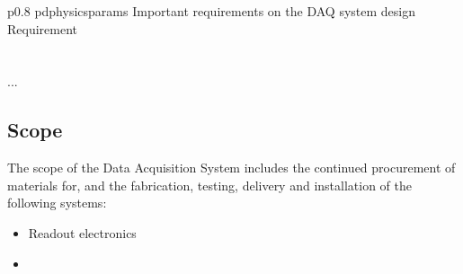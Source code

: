 \begin{dunetable}
{p{0.8\textwidth}}
{pdphysicsparams}
{Important requirements on the DAQ system design}   
Requirement  \\ \toprowrule
  \\ \colhline
   \\ \colhline
 ...\\ 
\end{dunetable}



\subsection{Scope}
\label{sec:fdsp-daq-scope}


The scope of the Data Acquisition System includes the continued procurement of materials for, and the fabrication, testing, delivery and installation of the following systems: 


\begin{itemize}
\item Readout electronics 
\item 
\end{itemize}


\newpage 
